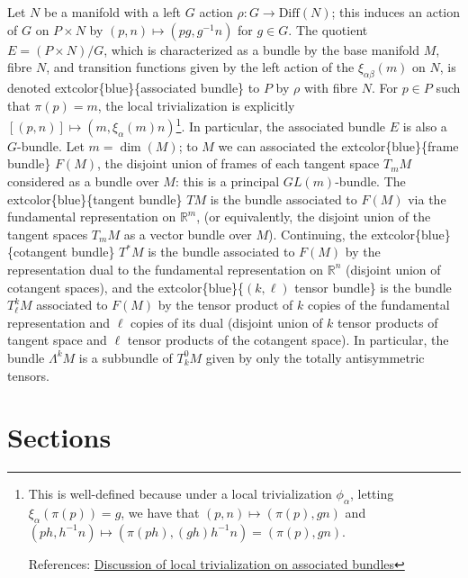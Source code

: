 \documentclass[
]{book}
\begin{document}
Let \(N\) be a manifold with a left \(G\) action \(\rho : G \to \text{Diff}(N)\); this induces an action of \(G\) on \(P \times N\) by \((p,n) \mapsto (pg, g^{-1}n)\) for \(g \in G\).
The quotient \(E = (P \times N) / G\), which is characterized as a bundle by the base manifold \(M\), fibre \(N\), and transition functions given by the left action of the \(\xi_{\alpha\beta}(m)\) on \(N\), is denoted extcolor\{blue\}\{associated bundle\} to \(P\) by \(\rho\) with fibre \(N\).
For \(p \in P\) such that \(\pi(p) = m\), the local trivialization is explicitly \([(p, n)] \mapsto (m, \xi_\alpha(m)n)\)\footnote{This is well-defined because under a local trivialization \(\phi_{\alpha}\), letting \(\xi_\alpha(\pi(p)) = g\), we have that \((p,n) \mapsto (\pi(p), gn)\) and \((ph, h^{-1}n) \mapsto (\pi(ph), (gh)h^{-1}n) = (\pi(p), gn)\).

  References: \href{https://math.stackexchange.com/questions/2439177/how-to-prove-local-trivialization-of-fiber-bundle-associated-to-principal-bundle}{Discussion of local trivialization on associated bundles}}.
In particular, the associated bundle \(E\) is also a \(G\)-bundle.
Let \(m = \dim(M)\); to \(M\) we can associated the extcolor\{blue\}\{frame bundle\} \(F(M)\), the disjoint union of frames of each tangent space \(T_m M\) considered as a bundle over \(M\): this is a principal \(GL(m)\)-bundle.
The extcolor\{blue\}\{tangent bundle\} \(TM\) is the bundle associated to \(F(M)\) via the fundamental representation on \(\mathbb{R}^m\), (or equivalently, the disjoint union of the tangent spaces \(T_m M\) as a vector bundle over \(M\)).
Continuing, the extcolor\{blue\}\{cotangent bundle\} \(T^*M\) is the bundle associated to \(F(M)\) by the representation dual to the fundamental representation on \(\mathbb{R}^n\) (disjoint union of cotangent spaces), and the extcolor\{blue\}\{\((k, \ell)\) tensor bundle\} is the bundle \(T^k_\ell M\) associated to \(F(M)\) by the tensor product of \(k\) copies of the fundamental representation and \(\ell\) copies of its dual (disjoint union of \(k\) tensor products of tangent space and \(\ell\) tensor products of the cotangent space).
In particular, the bundle \(\Lambda^k M\) is a subbundle of \(T^0_k M\) given by only the totally antisymmetric tensors.

\hypertarget{sections}{%
\section{Sections}\label{sections}}
\end{document}
